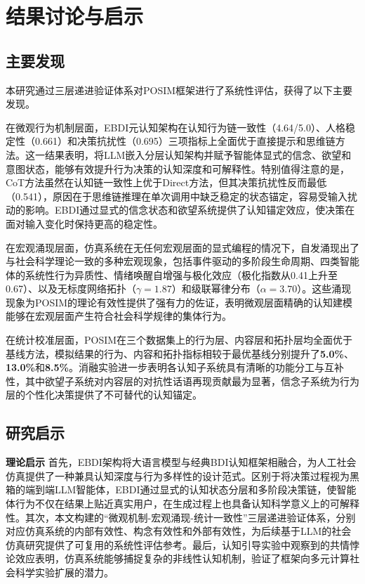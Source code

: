 \documentclass[a4paper,fleqn]{cas-sc}
\begin{document}
\section{结果讨论与启示}\label{sec:discussion}

\subsection{主要发现}

本研究通过三层递进验证体系对POSIM框架进行了系统性评估，获得了以下主要发现。

在微观行为机制层面，EBDI元认知架构在认知行为链一致性（4.64/5.0）、人格稳定性（0.661）和决策抗扰性（0.695）三项指标上全面优于直接提示和思维链方法。这一结果表明，将LLM嵌入分层认知架构并赋予智能体显式的信念、欲望和意图状态，能够有效提升行为决策的认知深度和可解释性。特别值得注意的是，CoT方法虽然在认知链一致性上优于Direct方法，但其决策抗扰性反而最低（0.541），原因在于思维链推理在单次调用中缺乏稳定的状态锚定，容易受输入扰动的影响。EBDI通过显式的信念状态和欲望系统提供了认知锚定效应，使决策在面对输入变化时保持更高的稳定性。

在宏观涌现层面，仿真系统在无任何宏观层面的显式编程的情况下，自发涌现出了与社会科学理论一致的多种宏观现象，包括事件驱动的多阶段生命周期、四类智能体的系统性行为异质性、情绪唤醒自增强与极化效应（极化指数从0.41上升至0.67）、以及无标度网络拓扑（$\gamma=1.87$）和级联幂律分布（$\alpha=3.70$）。这些涌现现象为POSIM的理论有效性提供了强有力的佐证，表明微观层面精确的认知建模能够在宏观层面产生符合社会科学规律的集体行为。

在统计校准层面，POSIM在三个数据集上的行为层、内容层和拓扑层均全面优于基线方法，模拟结果的行为、内容和拓扑指标相较于最优基线分别提升了\textbf{5.0\%}、\textbf{13.0\%}和\textbf{8.5\%}。消融实验进一步表明各认知子系统具有清晰的功能分工与互补性，其中欲望子系统对内容层的对抗性话语再现贡献最为显著，信念子系统为行为层的个性化决策提供了不可替代的认知锚定。

\subsection{研究启示}

\textbf{理论启示 }首先，EBDI架构将大语言模型与经典BDI认知框架相融合，为人工社会仿真提供了一种兼具认知深度与行为多样性的设计范式。区别于将决策过程视为黑箱的端到端LLM智能体，EBDI通过显式的认知状态分层和多阶段决策链，使智能体行为不仅在结果上贴近真实用户，在生成过程上也具备认知科学意义上的可解释性。其次，本文构建的“微观机制-宏观涌现-统计一致性”三层递进验证体系，分别对应仿真系统的内部有效性、构念有效性和外部有效性，为后续基于LLM的社会仿真研究提供了可复用的系统性评估参考。最后，认知引导实验中观察到的共情悖论效应表明，仿真系统能够捕捉复杂的非线性认知机制，验证了框架向多元计算社会科学实验扩展的潜力。
\end{document}
